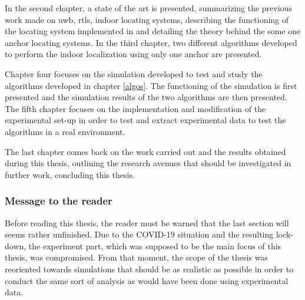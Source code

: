 In the second chapter, a state of the art is presented, summarizing the previous work made on \gls{uwb}, \gls{rtls}, indoor locating systems, describing the functioning of the locating system implemented in \cite{hannotier2019indoor} and detailing the theory behind the some one anchor  locating systems. In the third chapter, two different algorithms developed to perform the indoor localization using only one anchor are presented.
\vspace{2mm}

Chapter four focuses on the simulation developed to test and study the algorithms developed in chapter \ref{algos}. The functioning of the simulation is first presented and the simulation results of the two algorithms are then presented. The fifth chapter focuses on the implementation and modification of the experimental set-up in order to test and extract experimental data to test the algorithms in a real environment.
\vspace{2mm}

The last chapter comes back on the work carried out and the results obtained during this thesis, outlining the research avenues that should be investigated in further work, concluding this thesis.
\vspace{2mm}

\subsubsection{Message to the reader}

Before reading this thesis, the reader must be warned that the last section will seems rather unfinished. Due to the COVID-19 situation and the resulting lock-down, the experiment part, which was supposed to be the main focus of this thesis, was compromised. From that moment, the scope of the thesis was reoriented towards simulations that should be as realistic as possible in order to conduct the same sort of analysis as would have been done using experimental data.